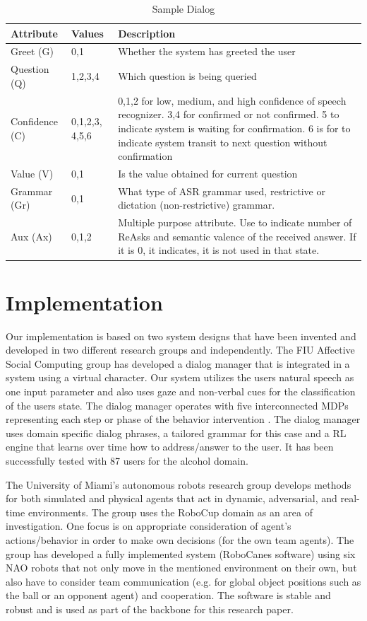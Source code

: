\documentclass[letterpaper]{article}
\begin{document}
\begin{table}
\caption{Sample Dialog}
\label{sampleDialog}
\begin{tabular}{ | p{20mm} | p{10mm} | p{40mm} | } \hline
    \textbf{Attribute} & \textbf{Values} & \textbf{Description} \\
    \hline
    Greet (G) & 0,1 & Whether the system has greeted the user \\
    \hline
    Question (Q) & 1,2,3,4 & Which question is being queried \\
    \hline
    Confidence (C) & 0,1,2,3, 4,5,6 & 0,1,2 for low, medium, and high confidence of speech 
recognizer. 3,4 for confirmed or not confirmed. 5 to indicate system is waiting for confirmation. 6 
is for to indicate system transit to next question without confirmation \\
    \hline
  Value (V) & 0,1 & Is the value obtained for current question \\
  \hline
  Grammar (Gr) & 0,1 & What type of ASR grammar used, restrictive or dictation (non-restrictive) 
grammar.  \\
    \hline
      Aux (Ax) & 0,1,2 & Multiple purpose attribute. Use to indicate number of ReAsks and semantic 
valence of the received answer. If it is 0, it indicates, it is not used in that state.  \\
        \hline
\end{tabular}
\end{table}


\section*{Implementation} 

Our implementation is based on two system designs that have been
invented and developed in two different research groups and independently. The FIU Affective Social Computing group has developed a dialog manager that is integrated in a system using a virtual 
character.  Our system utilizes the users natural speech as one input parameter and also uses gaze
and non-verbal cues for the classification of the users state. The dialog manager operates with five
interconnected MDPs representing each step or phase of the behavior intervention 
\cite{YASCLL14}. The dialog manager uses domain specific dialog phrases, a tailored grammar for
this case and a RL engine that learns over time how to address/answer to the user. It has been
successfully tested with 87 users for the alcohol domain.

The University of Miami's autonomous robots research group develops methods for both simulated and
physical agents that act in dynamic, adversarial, and real-time environments. The group uses the
RoboCup domain as an area of investigation. One  focus is on appropriate consideration of agent's
actions/behavior in order to make own decisions (for the own team agents). The group has developed a
fully implemented system (RoboCanes software) using six NAO robots that not only move in the
mentioned environment on their own, but also have to consider team communication (e.g. for global
object positions such as the ball or an opponent agent) and cooperation. The software is stable and
robust and is used as part of the backbone for this research paper.
\end{document}
